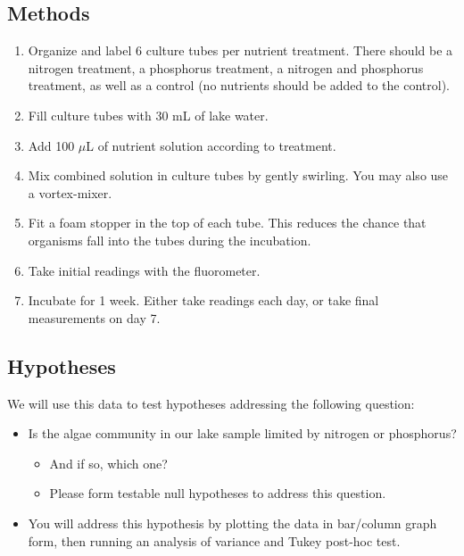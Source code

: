 \documentclass[11pt,]{article}
\providecommand{\tightlist}{%
\setlength{\itemsep}{0pt}\setlength{\parskip}{0pt}}
\begin{document}
\subsection{Methods}\label{methods}

\begin{enumerate}
\def\labelenumi{\arabic{enumi}.}
\tightlist
\item
  Organize and label 6 culture tubes per nutrient treatment. There
  should be a nitrogen treatment, a phosphorus treatment, a nitrogen and
  phosphorus treatment, as well as a control (no nutrients should be
  added to the control).
\item
  Fill culture tubes with 30 mL of lake water.
\item
  Add 100 \(\mu\)L of nutrient solution according to treatment.
\item
  Mix combined solution in culture tubes by gently swirling. You may
  also use a vortex-mixer.
\item
  Fit a foam stopper in the top of each tube. This reduces the chance
  that organisms fall into the tubes during the incubation.
\item
  Take initial readings with the fluorometer.
\item
  Incubate for 1 week. Either take readings each day, or take final
  measurements on day 7.
\end{enumerate}

\subsection{Hypotheses}\label{hypotheses}

We will use this data to test hypotheses addressing the following
question:

\begin{itemize}
\tightlist
\item
  Is the algae community in our lake sample limited by nitrogen or
  phosphorus?

  \begin{itemize}
  \tightlist
  \item
    And if so, which one?
  \item
    Please form testable null hypotheses to address this question.
  \end{itemize}
\item
  You will address this hypothesis by plotting the data in bar/column
  graph form, then running an analysis of variance and Tukey post-hoc
  test.
\end{itemize}
\end{document}
